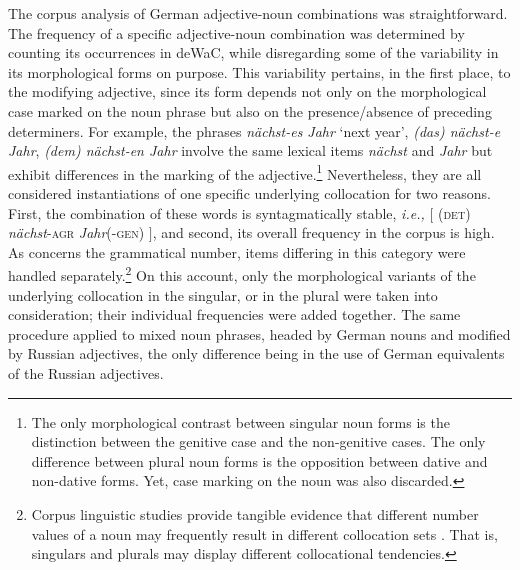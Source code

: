 The corpus analysis of German adjective-noun combinations was straightforward. The frequency of a specific adjective-noun combination was determined by counting its occurrences in deWaC, while disregarding some of the variability in its morphological forms on purpose. This variability pertains, in the first place, to the modifying adjective, since its form depends not only on the morphological case marked on the noun phrase but also on the presence/absence of preceding determiners. For example, the phrases \textit{nächst-es Jahr} `next year', \textit{(das) nächst-e Jahr}, \textit{(dem) nächst-en Jahr} involve the same lexical items \textit{nächst} and \textit{Jahr} but exhibit differences in the marking of the adjective.\footnote{The only morphological contrast between singular noun forms is the distinction between the genitive case and the non-genitive cases. The only difference between plural noun forms is the opposition between dative and non-dative forms. Yet, case marking on the noun was also discarded.} Nevertheless, they are all considered instantiations of one specific underlying collocation for two reasons. First, the combination of these words is syntagmatically stable, \textit{i.e.,} $[$ {(\textsc{det}) \textit{nächst}-\textsc{agr}} \textit{Jahr}(-\textsc{gen}) $]$, and second, its overall frequency in the corpus is high. As concerns the grammatical number, items differing in this category were handled separately.\footnote{Corpus linguistic studies provide tangible evidence that different number values of a noun may frequently result in different collocation sets \citep[e.g.,][167--172]{sinclair2003}. That is, singulars and plurals may display different collocational tendencies.} On this account, only the morphological variants of the underlying collocation in the singular, or in the plural were taken into consideration; their individual frequencies were added together. The same procedure applied to mixed noun phrases, headed by German nouns and modified by Russian adjectives, the only difference being in the use of German equivalents of the Russian adjectives.

